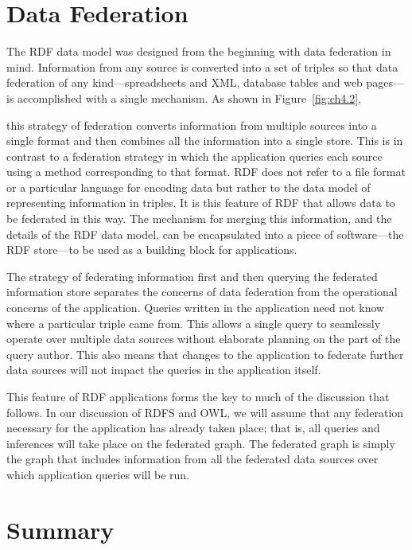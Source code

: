 \section{Data Federation}

The RDF data model was designed from the beginning with data federation
in mind. Information from any source is converted into a set of triples
so that data federation of any kind---spreadsheets and XML, database
tables and web pages---is accomplished with a single mechanism. As shown
in Figure~\ref{fig:ch4.2},

this strategy of federation converts information from multiple sources
into a single format and then combines all the information into a single
store. This is in contrast to a federation strategy in which the
application queries each source using a method corresponding to that
format. RDF does not refer to a file format or a particular language for
encoding data but rather to the data model of representing information
in triples. It is this feature of RDF that allows data to be federated
in this way. The mechanism for merging this information, and the details
of the RDF data model, can be encapsulated into a piece of
software---the RDF store---to be used as a building block for
applications.

The strategy of federating information first and then querying the
federated information store separates the concerns of data federation
from the operational concerns of the application. Queries written in the
application need not know where a particular triple came from. This
allows a single query to seamlessly operate over multiple data sources
without elaborate planning on the part of the query author. This also
means that changes to the application to federate further data sources
will not impact the queries in the application itself.

This feature of RDF applications forms the key to much of the discussion
that follows. In our discussion of RDFS and OWL, we will assume that any
federation necessary for the application has already taken place; that
is, all queries and inferences will take place on the federated graph.
The federated graph is simply the graph that includes information from
all the federated data sources over which application queries will be
run.

\section{Summary}

